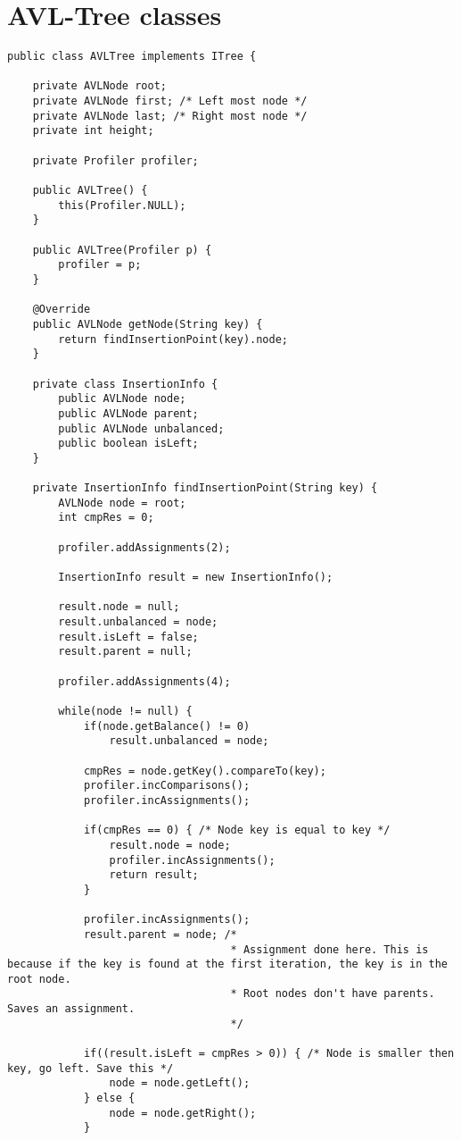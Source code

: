 \chapter{AVL-Tree classes}
\lstset{language=Java}
\begin{lstlisting}[caption=AVL-Tree classes Source code - AVLTree]
public class AVLTree implements ITree {

	private AVLNode root;
	private AVLNode first; /* Left most node */
	private AVLNode last; /* Right most node */
	private int height;
	
	private Profiler profiler;
	
	public AVLTree() {
		this(Profiler.NULL);
	}
	
	public AVLTree(Profiler p) {
		profiler = p;
	}
	
	@Override
	public AVLNode getNode(String key) {
		return findInsertionPoint(key).node;
	}
	
	private class InsertionInfo {
		public AVLNode node;
		public AVLNode parent;
		public AVLNode unbalanced;
		public boolean isLeft;
	}
	
	private InsertionInfo findInsertionPoint(String key) {
		AVLNode node = root;
		int cmpRes = 0;
		
		profiler.addAssignments(2);
		
		InsertionInfo result = new InsertionInfo();
		
		result.node = null;
		result.unbalanced = node;
		result.isLeft = false;
		result.parent = null;
		
		profiler.addAssignments(4);
		
		while(node != null) {
			if(node.getBalance() != 0)
				result.unbalanced = node;
			
			cmpRes = node.getKey().compareTo(key);
			profiler.incComparisons();
			profiler.incAssignments();
			
			if(cmpRes == 0) { /* Node key is equal to key */
				result.node = node;
				profiler.incAssignments();
				return result;
			}
			
			profiler.incAssignments();
			result.parent = node; /* 
								   * Assignment done here. This is because if the key is found at the first iteration, the key is in the root node. 
								   * Root nodes don't have parents. Saves an assignment.
								   */
			
			if((result.isLeft = cmpRes > 0)) { /* Node is smaller then key, go left. Save this */
				node = node.getLeft();
			} else {
				node = node.getRight();
			}
			

\end{lstlisting}

